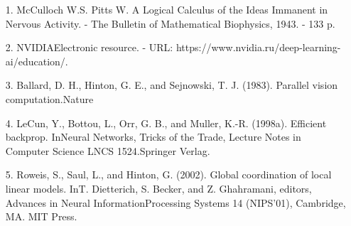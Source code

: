 \begin{thebibliography}

\begin{itemize}
    \item [1.] McCulloch W.S. Pitts W. A Logical Calculus of the Ideas Immanent in Nervous Activity. - The Bulletin of Mathematical Biophysics, 1943. - 133 p.
    
    \item [2.] NVIDIAElectronic resource. - URL: https://www.nvidia.ru/deep-learning-ai/education/.

    \item [3.] Ballard, D. H., Hinton, G. E., and Sejnowski, T. J. (1983). Parallel vision computation.Nature

    \item [4.] LeCun, Y., Bottou, L., Orr, G. B., and Muller, K.-R. (1998a). Efficient backprop. InNeural Networks, Tricks of the Trade, Lecture Notes in Computer Science LNCS 1524.Springer Verlag.

    \item [5.] Roweis, S., Saul, L., and Hinton, G. (2002). Global coordination of local linear models. InT. Dietterich, S. Becker, and Z. Ghahramani, editors, Advances in Neural InformationProcessing Systems 14 (NIPS'01), Cambridge, MA. MIT Press.

\end{itemize}

\end{thebibliography}